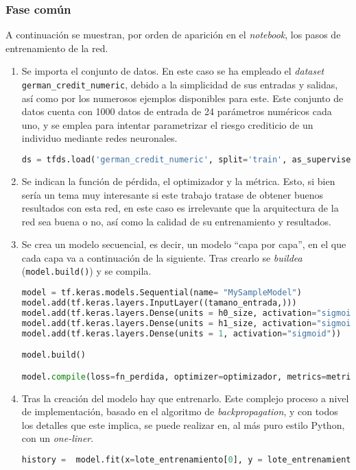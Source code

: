 \subsubsection{Fase común}
\label{sssec:modelo_pruebas_fase_comun}
A continuación se muestran, por orden de aparición en el \textit{notebook}, los pasos de entrenamiento de la red.

\begin{enumerate}
    \item Se importa el conjunto de datos. En este caso se ha empleado el \textit{dataset} \texttt{german\_credit\_numeric}, debido a la simplicidad de sus entradas y salidas, así como por los numerosos ejemplos disponibles para este. Este conjunto de datos cuenta con 1000 datos de entrada de 24 parámetros numéricos cada uno, y se emplea para intentar parametrizar el riesgo crediticio de un individuo mediante redes neuronales.\medskip
\begin{lstlisting}[language=Python]
ds = tfds.load('german_credit_numeric', split='train', as_supervised=True)
\end{lstlisting}

    \item Se indican la función de pérdida, el optimizador y la métrica. Esto, si bien sería un tema muy interesante si este trabajo tratase de obtener buenos resultados con esta red, en este caso es irrelevante que la arquitectura de la red sea buena o no, así como la calidad de su entrenamiento y resultados.

    \item Se crea un modelo secuencial, es decir, un modelo ``capa por capa'', en el que cada capa va a continuación de la siguiente. Tras crearlo se \textit{buildea} (\texttt{model.build()}) y se compila.\medskip
\begin{lstlisting}[language=Python]
model = tf.keras.models.Sequential(name= "MySampleModel")
model.add(tf.keras.layers.InputLayer((tamano_entrada,)))
model.add(tf.keras.layers.Dense(units = h0_size, activation="sigmoid"))
model.add(tf.keras.layers.Dense(units = h1_size, activation="sigmoid"))
model.add(tf.keras.layers.Dense(units = 1, activation="sigmoid"))

model.build()

model.compile(loss=fn_perdida, optimizer=optimizador, metrics=metrica)
\end{lstlisting}

    \item Tras la creación del modelo hay que entrenarlo. Este complejo proceso a nivel de implementación, basado en el algoritmo de \textit{backpropagation}, y con todos los detalles que este implica, se puede realizar en, al más puro estilo Python, con un \textit{one-liner}.\medskip
\begin{lstlisting}[language=Python]
history =  model.fit(x=lote_entrenamiento[0], y = lote_entrenamiento[1], batch_size = 20, epochs=num_epochs)
\end{lstlisting}
\end{enumerate}

